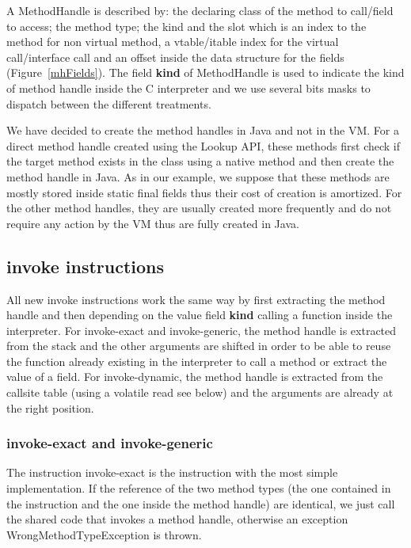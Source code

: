 \documentclass{sig-alternate}
\begin{document}
      A MethodHandle is described by: the declaring class of the method to call/field to access;
      the method type; the kind and the slot which is an index to the method for non virtual method,
      a vtable/itable index for the virtual call/interface call and an offset inside the data structure
      for the fields (Figure~\ref{mhFields}).
      The field {\bf kind} of MethodHandle is used to indicate the kind of method handle inside the C interpreter and we use
      several bits masks to dispatch between the different treatments.

      We have decided to create the method handles in Java and not in the VM.
      For a direct method handle created using the Lookup API, these methods first check
      if the target method exists in the class using a native method and then create
      the method handle in Java. As in our example, we suppose that these methods are
      mostly stored inside static final fields thus their cost of creation is amortized.
      For the other method handles, they are usually created more frequently
      and do not require any action by the VM thus are fully created in Java.

    \subsection{invoke instructions}
      All new invoke instructions work the same way by first extracting the method handle
      and then depending on the value field {\bf kind} calling a function inside the interpreter.
      For invoke-exact and invoke-generic, the method handle is extracted from the stack and
      the other arguments are shifted in order to be able to reuse the function already existing in the interpreter
      to call a method or extract the value of a field.
      For invoke-dynamic, the method handle is extracted from the callsite table (using a volatile read see below)
      and the arguments are already at the right position.

    \subsubsection{invoke-exact and invoke-generic}
      The instruction invoke-exact is the instruction with the most simple implementation.
      If the reference of the two method types (the one contained in the instruction and the one inside the method handle)
      are identical, we just call the shared code that invokes a method handle,
      otherwise an exception WrongMethodTypeException is thrown.\\
      
\end{document}
